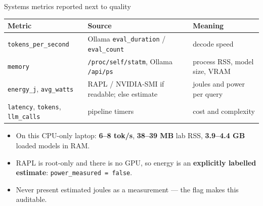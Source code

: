 \documentclass[aspectratio=169]{beamer}
\begin{document}
\begin{frame}{Systems metrics reported next to quality}
  \small
  \begin{tabular}{p{}p{}p{}}
  \toprule
  Metric & Source & Meaning \\
  \midrule
  \texttt{tokens\_per\_second} & Ollama \texttt{eval\_duration} / \texttt{eval\_count} & decode speed \\
  \texttt{memory} & \texttt{/proc/self/statm}, Ollama \texttt{/api/ps} & process RSS, model size, VRAM \\
  \texttt{energy\_j}, \texttt{avg\_watts} & RAPL / NVIDIA-SMI if readable; else estimate & joules and power per query \\
  \texttt{latency}, \texttt{tokens}, \texttt{llm\_calls} & pipeline timers & cost and complexity \\
  \bottomrule
  \end{tabular}
  \vspace{2mm}
  \begin{itemize}
    \item On this CPU-only laptop: \textbf{6--8 tok/s}, \textbf{38--39 MB} lab RSS, \textbf{3.9--4.4 GB} loaded models in RAM.
    \item RAPL is root-only and there is no GPU, so energy is an \textbf{explicitly labelled estimate}: \texttt{power\_measured = false}.
    \item Never present estimated joules as a measurement --- the flag makes this auditable.
  \end{itemize}
\end{frame}
\end{document}
